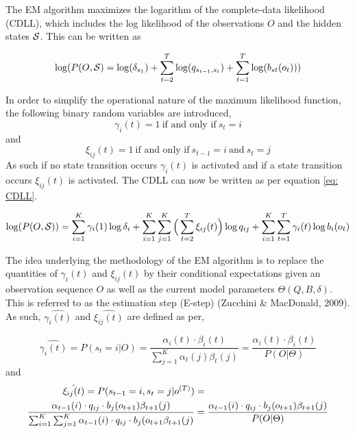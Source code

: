 The EM algorithm maximizes the logarithm of the complete-data likelihood (CDLL), which includes the log likelihood of the observations $O$ and the hidden states $\S$. This can be written as

\begin{equation}
    \log(P(O,\S) = \log(\delta_{s_1}) + \sum_{t=2}^T \log(q_{s_{t-1},s_t})+\sum_{t=1}^T \log(b_{st}(o_t)))
    \label{eq: alternative_log_likelihood}
\end{equation}

In order to simplify the operational nature of the maximum likelihood function, the following binary random variables are introduced,
$$
\gamma_i(t) = 1 \ \text{if and only if}\ s_t = i
$$
and
$$
\xi_{ij}(t) = 1 \ \text{if and only if}\ s_{t-1}=i\ \text{and}\ s_t = j
$$
As such if no state transition occurs $\gamma_i(t)$ is activated and if a state transition occurs $\xi_{ij}(t)$ is activated. The CDLL can now be written as per equation \ref{eq: CDLL}.

\begin{equation}
    \log(P(O, \S)) = \sum_{i=1}^K \gamma_i(1) \log\delta_i + \sum_{i=1}^K \sum_{j=1}^K \Big(\sum_{t=2}^T \xi_{ij}(t)\Big) \log q_{ij}+ \sum_{i=1}^K \sum_{t=1}^T \gamma_i(t) \log b_i(o_t) 
    \label{eq: CDLL}
\end{equation}

The idea underlying the methodology of the EM algorithm is to replace the quantities of $\gamma_i(t)$ and $\xi_{ij}(t)$ by their conditional expectations given an observation sequence $O$ as well as the current model parameters $\Theta(Q, B,\delta)$. This is referred to as the estimation step (E-step) (Zucchini \& MacDonald, 2009). As such, $\hat{\gamma_i(t)}$ and $\hat{\xi_{ij}(t)}$ are defined as per,

\begin{equation}
    \hat{\gamma_i(t)} = P(s_t=i | O) = \frac{\alpha_i(t) \cdot \beta_i(t)}{\sum_{j=1}^K \alpha_t(j)\beta_t(j)} = \frac{\alpha_i(t) \cdot \beta_i(t)}{P(O|\Theta)}
    \label{eq: gamma}
\end{equation}
and
\begin{align}
    \hat{\xi_{ij}(t)} = P(s_{t-1}=i, s_t=j|o^{(T)}) &= \label{eq: xi} \\ 
    \frac{\alpha_{t-1}(i) \cdot q_{ij} \cdot b_j(o_{t+1})\beta_{t+1}(j)}
            {\sum_{i=1}^K\sum_{j=1}^K\alpha_{t-1}(i) \cdot q_{ij} \cdot b_j(o_{t+1}\beta_{t+1}(j)}
    &= \frac{\alpha_{t-1}(i) \cdot q_{ij} \cdot b_j(o_{t+1})\beta_{t+1}(j)}{P(O|\Theta)}  \notag
\end{align}

